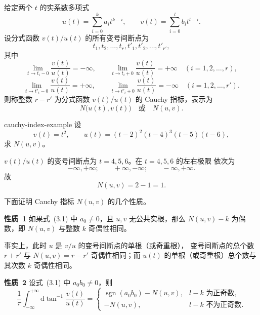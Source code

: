 给定两个 $t$ 的实系数多项式
\[
  u(t)=\sum_{i=0}^k a_it^{k-i},\qquad
  v(t)=\sum_{i=0}^l b_it^{l-i}. \tag{3.1}
\]
设分式函数 $v(t)/u(t)$ 的所有变号间断点为
\[
  t_1,t_2,\ldots,t_r,t'_1,t'_2,\ldots,t'_{r'},
\]
其中
\[
  \lim_{t\to t_i-0}\dfrac{v(t)}{u(t)}=-\infty,\qquad
  \lim_{t\to t_i+0}\dfrac{v(t)}{u(t)}=+\infty
  \quad(i=1,2,\ldots,r),
\]
\[
  \lim_{t\to t'_i-0}\dfrac{v(t)}{u(t)}=+\infty,\qquad
  \lim_{t\to t'_i+0}\dfrac{v(t)}{u(t)}=-\infty
  \quad(i=1,2,\ldots,r').
\]
则称整数 $r-r'$ 为分式函数 $v(t)/u(t)$ 的 Cauchy 指标，表示为
\[
  N\bigl(u(t),v(t)\bigr)\quad\text{或}\quad N(u,v).
\]

\begin{example}{}{cauchy-index-example}
设
\[
  v(t)=t^2,\qquad
  u(t)=(t-2)^2(t-4)^3(t-5)(t-6),
\]
求 $N(u,v)$。

\begin{solution}
$v(t)/u(t)$ 的变号间断点为 $t=4,5,6$。在 $t=4,5,6$ 的左右极限
依次为
\[
  -\infty,+\infty;\qquad +\infty,-\infty;\qquad -\infty,+\infty.
\]
故
\[
  N(u,v)=2-1=1.
\]
\end{solution}
\end{example}

下面证明 Cauchy 指标 $N(u,v)$ 的几个性质。

\noindent\textbf{性质~1}\quad
如果式~(3.1) 中 $a_0\ne0$，且 $u,v$ 无公共实根，那么
$N(u,v)-k$ 为偶数，即 $N(u,v)$ 与整数 $k$ 奇偶性相同。

事实上，此时 $u$ 是 $v/u$ 的变号间断点的单根（或奇重根），
变号间断点的总个数 $r+r'$ 与 $N(u,v)=r-r'$ 奇偶性相同；而
$u(t)$ 的单根（或奇重根）总个数与其次数 $k$ 奇偶性相同。

\noindent\textbf{性质~2}\quad
设式~(3.1) 中 $a_0b_0\ne0$，则
\[
  \dfrac{1}{\pi}\int_{-\infty}^{+\infty}
  \mathrm{d}\tan^{-1}\dfrac{v(t)}{u(t)}
  =
  \begin{cases}
    \operatorname{sgn}(a_0b_0)-N(u,v),&l-k\text{ 为正奇数},\\
    -N(u,v),&l-k\text{ 不为正奇数}.
  \end{cases} \tag{3.2}
\]

